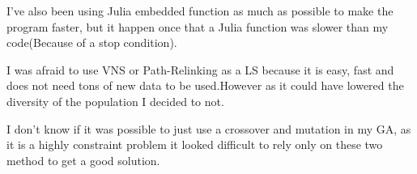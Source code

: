 \documentclass[12pt]{article}
\begin{document}
	I've also been using Julia embedded function as much as possible to make the program faster, but it happen once that a Julia function was slower than my code(Because of a stop condition).
	
	I was afraid to use VNS or Path-Relinking as a LS because it is easy, fast and does not need tons of new data to be used.However as it could have lowered the diversity of the population I decided to not.
	
	I don't know if it was possible to just use a crossover and mutation in my GA, as it is a highly constraint problem it looked difficult to rely only on these two method to get a good solution.
	
\end{document}
